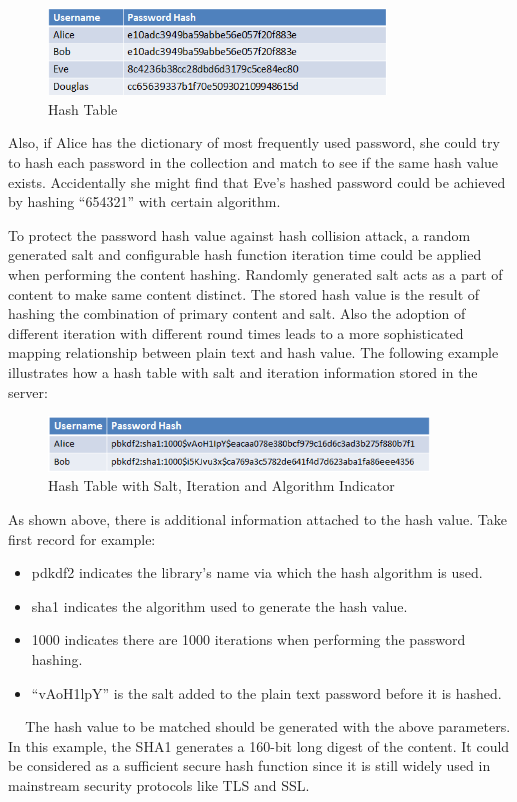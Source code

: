 \begin{figure}[h]
        \centering
        \includegraphics[width=0.8\textwidth]{figures/Hash_Table.png}
        \caption[Hash Table] {Hash Table}
\end{figure}

Also, if Alice has the dictionary of most frequently used password, she could try to hash each password in the collection and match to see if the same hash value exists. Accidentally she might find that Eve’s hashed password could be achieved by hashing ``654321'' with certain algorithm.

To protect the password hash value against hash collision attack, a random generated salt and configurable hash function iteration time could be applied when performing the content hashing. Randomly generated salt acts as a part of content to make same content distinct. The stored hash value is the result of hashing the combination of primary content and salt. Also the adoption of different iteration with different round times leads to a more sophisticated mapping relationship between plain text and hash value. The following example illustrates how a hash table with salt and iteration information stored in the server:

\begin{figure}[h]
        \centering
        \includegraphics[width=0.9\textwidth]{figures/Hash_Table_with_Salt_Iteration_and_Algorithm_Indicated.png}
        \caption[Hash Table with Parameters] {Hash Table with Salt, Iteration and Algorithm Indicator}
\end{figure}

As shown above, there is additional information attached to the hash value. Take first record for example:

\begin{itemize}
  \item
  pdkdf2 indicates the library’s name via which the hash algorithm is used.
  \item
  sha1 indicates the algorithm used to generate the hash value.
  \item
  1000 indicates there are 1000 iterations when performing the password hashing.
  \item
  ``vAoH1lpY'' is the salt added to the plain text password before it is hashed.
\end{itemize}
		
The hash value to be matched should be generated with the above parameters. In this example, the SHA1 generates a 160-bit long digest of the content. It could be considered as a sufficient secure hash function since it is still widely used in mainstream security protocols like TLS and SSL.

